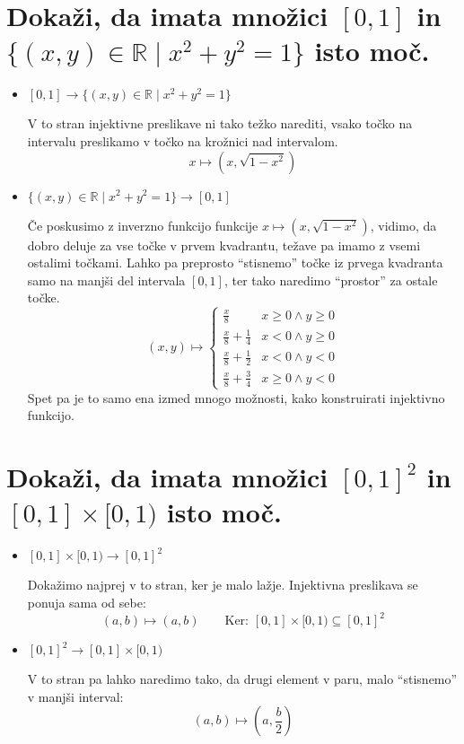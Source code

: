 \documentclass[a4paper, 12pt]{article}
\newcommand{\RR}{\ensuremath{\mathbb{R}}}
\begin{document}
    \section{Dokaži, da imata množici $[0, 1]$ in $\{(x, y)\in\RR \mid x^2 + y^2 =1 \}$ isto moč.}
    \begin{itemize}
        \item $[0, 1] \to \{(x, y)\in\RR \mid x^2 + y^2 =1 \}$
        
        V to stran injektivne preslikave ni tako težko narediti, vsako točko na intervalu preslikamo v točko na krožnici nad intervalom.
        \[
        x \mapsto (x, \sqrt{1 - x^2})
        \]
        \item $\{(x, y)\in\RR \mid x^2 + y^2 =1 \} \to [0, 1]$
        
        Če poskusimo z inverzno funkcijo funkcije $x \mapsto (x, \sqrt{1 - x^2})$, vidimo, da dobro deluje za vse točke v prvem kvadrantu, težave pa imamo z vsemi ostalimi točkami. Lahko pa preprosto ``stisnemo'' točke iz prvega kvadranta samo na manjši del intervala $[0, 1]$, ter tako naredimo ``prostor'' za ostale točke.
        \[
        (x, y) \mapsto \left\{ \begin{array}{ll}
            \frac{x}{8} & x \geq 0 \land y \geq 0 \\
            \frac{x}{8} + \frac{1}{4} & x < 0 \land y \geq 0 \\
            \frac{x}{8} + \frac{1}{2} & x < 0 \land y < 0 \\
            \frac{x}{8} + \frac{3}{4} & x \geq 0 \land y < 0
        \end{array} \right.
        \]
        Spet pa je to samo ena izmed mnogo možnosti, kako konstruirati injektivno funkcijo.
    \end{itemize}

    \section{Dokaži, da imata množici $[0, 1]^2$ in $[0, 1] \times [0, 1)$ isto moč.}
    \label{naloga4}
    \begin{itemize}
        \item $[0, 1] \times [0, 1) \to [0, 1]^2$
        
        Dokažimo najprej v to stran, ker je malo lažje. Injektivna preslikava se ponuja sama od sebe: 
        \[
        (a, b) \mapsto (a, b)\qquad \text{Ker: } [0, 1] \times [0, 1) \subseteq [0, 1]^2
        \]        
        \item $[0, 1]^2 \to [0, 1] \times [0, 1)$
        
        V to stran pa lahko naredimo tako, da drugi element v paru, malo ``stisnemo'' v manjši interval:
        \[
        (a, b) \mapsto \left(a, \frac{b}{2} \right)
        \]
    \end{itemize}
\end{document}
